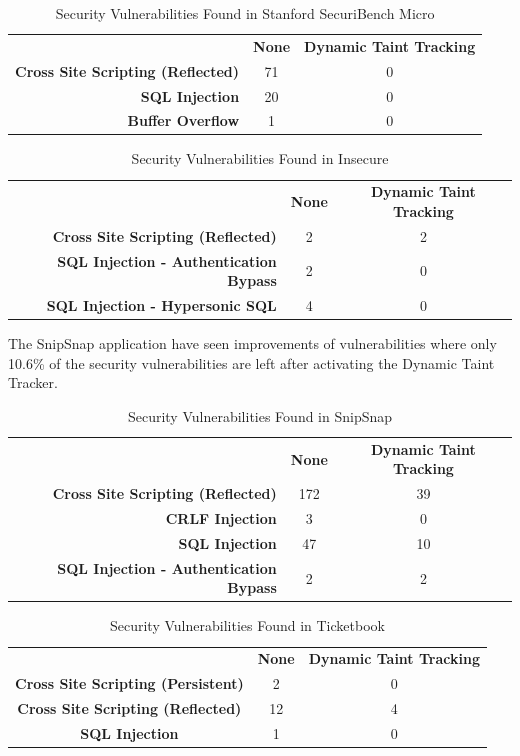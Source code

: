 \begin{table}[H]
  \centering
  \caption{Security Vulnerabilities Found in Stanford SecuriBench Micro}
  \label{table:MicroTable}
    \begin{tabular}{rcc}
      & \textbf{None} & \textbf{Dynamic Taint Tracking} \\
      \textbf{Cross Site Scripting (Reflected)} & 71            & 0  \\
      \textbf{SQL Injection}                    & 20            & 0  \\
      \textbf{Buffer Overflow}                  & 1             & 0  
    \end{tabular}
\end{table}


\begin{table}[H]
  \centering
  \caption{Security Vulnerabilities Found in Insecure}
  \label{table:InsecureTable}
    \begin{tabular}{rcc}
      & \textbf{None} & \textbf{Dynamic Taint Tracking} \\
      \textbf{Cross Site Scripting (Reflected)}      & 2             & 2  \\
      \textbf{SQL Injection - Authentication Bypass} & 2             & 0  \\
      \textbf{SQL Injection - Hypersonic SQL}        & 4             & 0  
    \end{tabular}
\end{table}


The SnipSnap \parencite{snipsnap} application have seen improvements of vulnerabilities where only 10.6\% of the security vulnerabilities are left after activating the Dynamic Taint Tracker.


\begin{table}[H]
  \centering
  \caption{Security Vulnerabilities Found in SnipSnap}
  \label{table:SnipSnapTable}
  \begin{tabular}{rcc}
    & \textbf{None} & \textbf{Dynamic Taint Tracking} \\
    \textbf{Cross Site Scripting (Reflected)}      & 172           & 39   \\
    \textbf{CRLF Injection}                        & 3             & 0    \\
    \textbf{SQL Injection}                         & 47            & 10   \\
    \textbf{SQL Injection - Authentication Bypass} & 2             & 2       
  \end{tabular}
\end{table}


\begin{table}[H]
  \centering
  \caption{Security Vulnerabilities Found in Ticketbook}
  \label{table:Ticketbook}
  \begin{tabular}{ccc}
    & \textbf{None} & \textbf{Dynamic Taint Tracking} \\
    \textbf{Cross Site Scripting (Persistent)} & 2             & 0 \\
    \textbf{Cross Site Scripting (Reflected)}  & 12            & 4 \\
    \textbf{SQL Injection}                     & 1             & 0
  \end{tabular}
\end{table}
